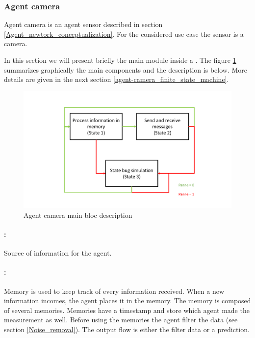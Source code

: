 \subsubsection{Agent camera}
\label{agent_camera_implementation}

Agent camera is an agent sensor described in section \ref{Agent_newtork_conceptualization}. For the considered use case the sensor is a camera.

In this section we will present briefly the main module inside a . The figure \ref{fig: agent_camera-bloc-overview} summarizes graphically the main components and the description is below. More details are given in the next section \ref{agent-camera_finite_state_machine}.

\label{agent-camera_overview}

\begin{figure}[h!]
    \centering
    \includegraphics[page=7,clip,width = 12cm]{systeme_multi_agent/realisation/multi_agent_implemented_schematic.pdf}
    \caption{Agent camera main bloc description}
    \label{fig: agent_camera-bloc-overview}
\end{figure}

\paragraph{:} Source of information for the agent.

\paragraph{:} 
Memory is used to keep track of every information received. When a new information incomes, the agent places it in the memory. The memory is composed of several memories. Memories have a timestamp and store which agent made the measurement as well. Before using the memories the agent filter the data (see section \ref{Noise_removal}). The output flow is either the filter data or a prediction.


